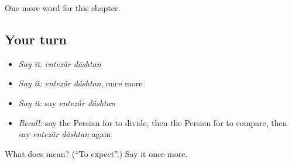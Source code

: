 \begin{grammarlens}[title={What you've built}]
One more word for this chapter.
\end{grammarlens}

\subsection*{Your turn}
\begin{itemize}
\raggedright
  \item \emph{Say it:} \emph{entezâr dâshtan}
  \item \emph{Say it:} \emph{entezâr dâshtan}, once more
  \item \emph{Say it:} say \emph{entezâr dâshtan}
  \item \emph{Recall:} say the Persian for to divide, then the Persian for to compare, then say \emph{entezâr dâshtan} again
\end{itemize}

\begin{tcolorbox}[breakable,colback=teal!4,colframe=teal!35!black,title={Before you move on}]
What does   mean? (\textquotedblleft{}To expect\textquotedblright{}.) Say it once more.
\end{tcolorbox}
